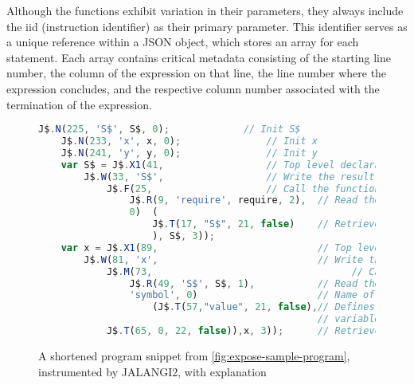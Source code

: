 Although the functions exhibit variation in their parameters, they always include the iid (instruction identifier) as their primary parameter. This identifier serves as a unique reference within a JSON object, which stores an array for each statement. Each array contains critical metadata consisting of the starting line number, the column of the expression on that line, the line number where the expression concludes, and the respective column number associated with the termination of the expression.



\begin{figure}[ht]

 \lstset{basicstyle=\footnotesize}
    \begin{lstlisting}[language=JavaScript, gobble=4]
    J$.N(225, 'S$', S$, 0);             // Init S$
    J$.N(233, 'x', x, 0);               // Init x
    J$.N(241, 'y', y, 0);               // Init y
    var S$ = J$.X1(41,                  // Top level declaration
        J$.W(33, 'S$',                  // Write the result of the following:
            J$.F(25,                    // Call the function with the follwing parameter:
                J$.R(9, 'require', require, 2),  // Read the value of the expression "require"
                0)  (
                    J$.T(17, "S$", 21, false)    // Retrieve the value of the S$ object
                    ), S$, 3));
    var x = J$.X1(89,                            // Top level declaration
        J$.W(81, 'x',                            // Write the result of the following:
            J$.M(73,                                   // Call the function of:
                J$.R(49, 'S$', S$, 1),           // Read the value of the expression S$
                'symbol', 0)                     // Name of the called function
                    (J$.T(57,"value", 21, false),// Defines the value of the 
                                                 // variable as literal
            J$.T(65, 0, 22, false)),x, 3));      // Retrieve the value "0"


    \end{lstlisting}
    \caption{A shortened program snippet from \autoref{fig:expose-sample-program}, instrumented by JALANGI2, with explanation}
    \label{fig:code-snippet}
\end{figure}

